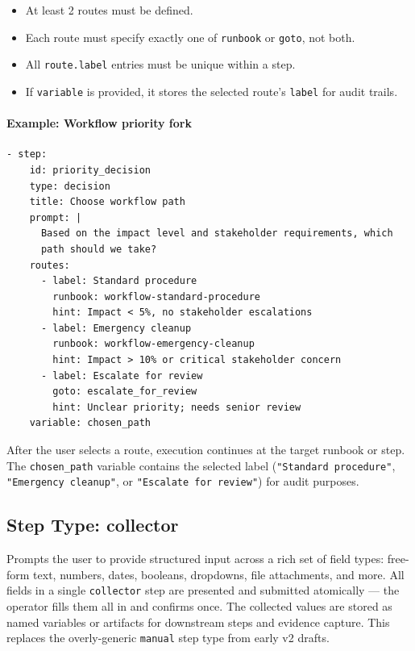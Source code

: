 \begin{itemize}
  \item At least 2 routes must be defined.
  \item Each route must specify exactly one of \texttt{runbook} or \texttt{goto}, not both.
  \item All \texttt{route.label} entries must be unique within a step.
  \item If \texttt{variable} is provided, it stores the selected route's \texttt{label}
        for audit trails.
\end{itemize}

\paragraph{Example: Workflow priority fork}

\begin{verbatim}
- step:
    id: priority_decision
    type: decision
    title: Choose workflow path
    prompt: |
      Based on the impact level and stakeholder requirements, which
      path should we take?
    routes:
      - label: Standard procedure
        runbook: workflow-standard-procedure
        hint: Impact < 5%, no stakeholder escalations
      - label: Emergency cleanup
        runbook: workflow-emergency-cleanup
        hint: Impact > 10% or critical stakeholder concern
      - label: Escalate for review
        goto: escalate_for_review
        hint: Unclear priority; needs senior review
    variable: chosen_path
\end{verbatim}

After the user selects a route, execution continues at the target runbook or
step.  The \texttt{chosen\_path} variable contains the selected label
(\texttt{"Standard procedure"}, \texttt{"Emergency cleanup"}, or
\texttt{"Escalate for review"}) for audit purposes.

\subsection{Step Type: collector}
\label{subsec:step-collector}

Prompts the user to provide structured input across a rich set of field types:
free-form text, numbers, dates, booleans, dropdowns, file attachments, and more.
All fields in a single \texttt{collector} step are presented and submitted
atomically — the operator fills them all in and confirms once.
The collected values are stored as named variables or artifacts for downstream
steps and evidence capture.  This replaces the overly-generic \texttt{manual}
step type from early v2 drafts.


